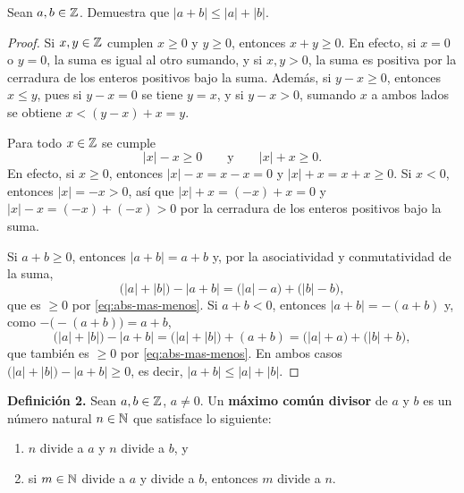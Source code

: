 \documentclass[12pt,a4paper]{article}
\begin{document}
    \begin{problema}
        Sean $a,b\in\mathbb{Z}$. Demuestra que $|a+b|\le|a|+|b|$.
    \end{problema}

    \begin{proof}
        Si $x,y\in\mathbb{Z}$ cumplen $x\ge0$ y $y\ge0$, entonces $x+y\ge0$. En efecto, si
        $x=0$ o $y=0$, la suma es igual al otro sumando, y si $x,y>0$, la suma es positiva por la cerradura de los
        enteros positivos bajo la suma. Además, si $y-x\ge0$, entonces $x\le y$, pues si $y-x=0$ se tiene $y=x$, y si
        $y-x>0$, sumando $x$ a ambos lados se obtiene $x<(y-x)+x=y$.

        Para todo $x\in\mathbb{Z}$ se cumple
        \begin{equation}\label{eq:abs-mas-menos}
            |x|-x\ge0 \qquad\text{y}\qquad |x|+x\ge0.
        \end{equation}
        En efecto, si $x\ge0$, entonces $|x|-x=x-x=0$ y $|x|+x=x+x\ge0$. Si $x<0$, entonces $|x|=-x>0$, así que
        $|x|+x=(-x)+x=0$ y $|x|-x=(-x)+(-x)>0$ por la cerradura de los enteros positivos bajo la suma.

        Si $a+b\ge0$, entonces $|a+b|=a+b$ y, por la asociatividad y conmutatividad de la suma,
        \begin{equation*}
            \big(|a|+|b|\big)-|a+b|=\big(|a|-a\big)+\big(|b|-b\big),
        \end{equation*}
        que es $\ge0$ por \eqref{eq:abs-mas-menos}. Si $a+b<0$, entonces $|a+b|=-(a+b)$ y, como $-\big(-(a+b)\big)=a+b$,
        \begin{equation*}
            \big(|a|+|b|\big)-|a+b|=\big(|a|+|b|\big)+(a+b)=\big(|a|+a\big)+\big(|b|+b\big),
        \end{equation*}
        que también es $\ge0$ por \eqref{eq:abs-mas-menos}. En ambos casos $\big(|a|+|b|\big)-|a+b|\ge0$, es decir,
        $|a+b|\le|a|+|b|$.
    \end{proof}

    \textbf{Definición 2.} Sean $a,b\in\mathbb{Z}$, $a\neq0$. Un \textbf{máximo común divisor} de $a$ y $b$ es un número
    natural $n\in\mathbb{N}$ que satisface lo siguiente:
    \begin{enumerate}[label=\alph*)]
        \item $n$ divide a $a$ y $n$ divide a $b$, y
        \item si $m\in\mathbb{N}$ divide a $a$ y divide a $b$, entonces $m$ divide a $n$.
    \end{enumerate}
\end{document}

